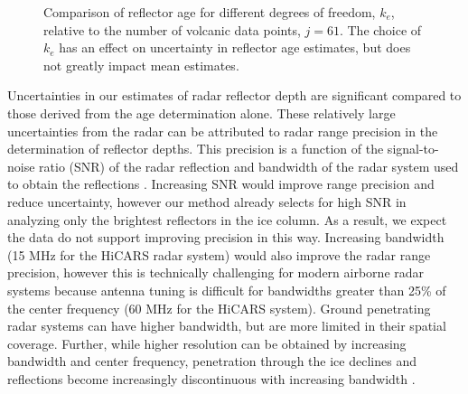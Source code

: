 \begin{figure*}
\begin{center}
{}
\caption{Comparison of reflector age for different degrees of freedom, $k_e$, relative to the number of volcanic data points, $j=61$. The choice of $k_e$ has an effect on uncertainty in reflector age estimates, but does not greatly impact mean estimates. }
\end{center}
\label{fig:ke}
\end{figure*}


Uncertainties in our estimates of radar reflector depth are significant compared to those derived from the age determination alone. These relatively large uncertainties from the radar can be attributed to radar range precision in the determination of reflector depths. This precision is a function of the signal-to-noise ratio (SNR) of the radar reflection and bandwidth of the radar system used to obtain the reflections \citep{cavitte2016}. Increasing SNR would improve range precision and reduce uncertainty, however our method already selects for high SNR in analyzing only the brightest reflectors in the ice column. As a result, we expect the data do not support improving precision in this way. Increasing bandwidth (15 MHz for the HiCARS radar system) would also improve the radar range precision, however this is technically challenging for modern airborne radar systems because antenna tuning is difficult for bandwidths greater than 25\% of the center frequency (60 MHz for the HiCARS system). Ground penetrating radar systems can have higher bandwidth, but are more limited in their spatial coverage. Further, while higher resolution can be obtained by increasing bandwidth and center frequency, penetration through the ice declines and reflections become increasingly discontinuous with increasing bandwidth \citep{cavitte2016}.






